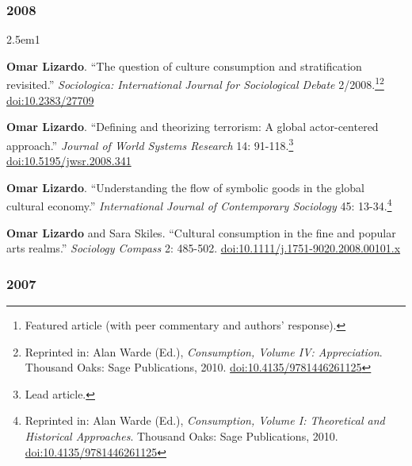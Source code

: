 \documentclass[
]{article}
\newenvironment{cventry}{\begin{hangparas}{2.5em}{1}}{\end{hangparas}}
\begin{document}
\subsubsection{2008}\label{section-11}

\begin{cventry}

\textbf{Omar Lizardo}. ``The question of culture consumption and
stratification revisited.'' \emph{Sociologica: International Journal for
Sociological Debate} 2/2008.\footnote{Featured article (with peer
  commentary and authors' response).}\footnote{Reprinted in: Alan Warde
  (Ed.), \emph{Consumption, Volume IV: Appreciation}. Thousand Oaks:
  Sage Publications, 2010.
  \href{https://doi.org/10.4135/9781446261125}{doi:10.4135/9781446261125}}
\href{https://www.rivisteweb.it/doi/10.2383/27709}{doi:10.2383/27709}

\textbf{Omar Lizardo}. ``Defining and theorizing terrorism: A global
actor-centered approach.'' \emph{Journal of World Systems Research} 14:
91-118.\footnote{Lead article.}
\href{https://doi.org/10.5195/jwsr.2008.341}{doi:10.5195/jwsr.2008.341}

\textbf{Omar Lizardo}. ``Understanding the flow of symbolic goods in the
global cultural economy.'' \emph{International Journal of Contemporary
Sociology} 45: 13-34.\footnote{Reprinted in: Alan Warde (Ed.),
  \emph{Consumption, Volume I: Theoretical and Historical Approaches}.
  Thousand Oaks: Sage Publications, 2010.
  \href{https://doi.org/10.4135/9781446261125}{doi:10.4135/9781446261125}}

\textbf{Omar Lizardo} and Sara Skiles. ``Cultural consumption in the
fine and popular arts realms.'' \emph{Sociology Compass} 2: 485-502.
\href{https://doi.org/10.1111/j.1751-9020.2008.00101.x}{doi:10.1111/j.1751-9020.2008.00101.x}

\end{cventry}

\subsubsection{2007}\label{section-12}
\end{document}
